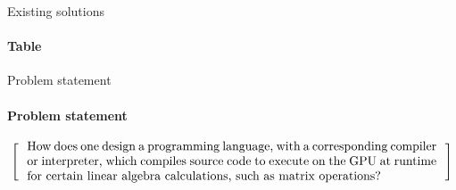 
\begin{frame}{Existing solutions}
\framesubtitle{Table }
   
\end{frame}

\begin{frame}{Problem statement}
\framesubtitle{Problem statement}
\[
  \left[
  \begin{minipage}{\textwidth}
  \centering
  \begin{minipage}{0.96\textwidth}
  How does one design a programming language, with a corresponding compiler or interpreter, which compiles source code to execute on the GPU at runtime for certain linear algebra calculations, such as matrix operations?
  \end{minipage}
  \end{minipage}
    \right]
\]
\end{frame}